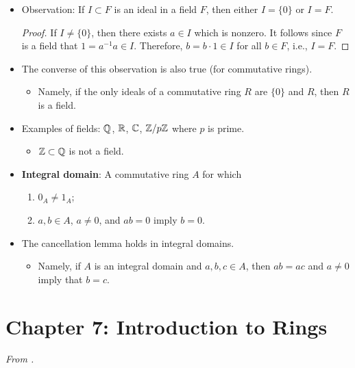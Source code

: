 \documentclass[../notes.tex]{subfiles}
\begin{document}
\begin{itemize}
\begin{enumerate}[label={(\roman*)}]
    \end{enumerate}
    \item Observation: If $I\subset F$ is an ideal in a field $F$, then either $I=\{0\}$ or $I=F$.
    \begin{proof}
        If $I\neq\{0\}$, then there exists $a\in I$ which is nonzero. It follows since $F$ is a field that $1=a^{-1}a\in I$. Therefore, $b=b\cdot 1\in I$ for all $b\in F$, i.e., $I=F$.
    \end{proof}
    \item The converse of this observation is also true (for commutative rings).
    \begin{itemize}
        \item Namely, if the only ideals of a commutative ring $R$ are $\{0\}$ and $R$, then $R$ is a field.
    \end{itemize}
    \item Examples of fields: $\mathbb{Q}$, $\mathbb{R}$, $\mathbb{C}$, $\mathbb{Z}/p\mathbb{Z}$ where $p$ is prime.
    \begin{itemize}
        \item $\mathbb{Z}\subset\mathbb{Q}$ is not a field.
    \end{itemize}
    \item \textbf{Integral domain}: A commutative ring $A$ for which
    \begin{enumerate}
        \item $0_A\neq 1_A$;
        \item $a,b\in A$, $a\neq 0$, and $ab=0$ imply $b=0$.
    \end{enumerate}
    \item The cancellation lemma holds in integral domains.
    \begin{itemize}
        \item Namely, if $A$ is an integral domain and $a,b,c\in A$, then $ab=ac$ and $a\neq 0$ imply that $b=c$.
    \end{itemize}
\end{itemize}



\section{Chapter 7: Introduction to Rings}
\emph{From \textcite{bib:DummitFoote}.}
\end{document}
